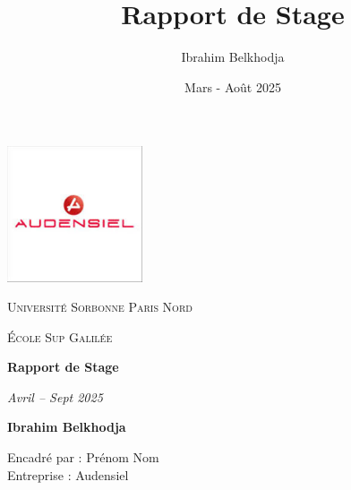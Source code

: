 \documentclass[12pt]{report}
\title{Rapport de Stage}
\author{Ibrahim Belkhodja}
\date{Mars - Août 2025}
\begin{document}
\begin{titlepage}
    \centering
    \includegraphics[width=0.3\textwidth]{images/logo.png}\par
    \vspace{1cm}
    {\scshape\LARGE Université Sorbonne Paris Nord \par}
    \vspace{1cm}
    {\scshape\Large École Sup Galilée\par}
    \vspace{1.5cm}
    {\huge\bfseries Rapport de Stage\par}
    \vspace{0.5cm}
    {\Large\itshape Avril – Sept 2025\par}
    \vspace{2.5cm}
    {\Large\bfseries Ibrahim Belkhodja\par}
    \vfill
    {\large Encadré par : Prénom Nom \\ Entreprise : Audensiel\par}
    \vspace{1cm}
\end{titlepage}

\tableofcontents
\clearpage







\end{document}
